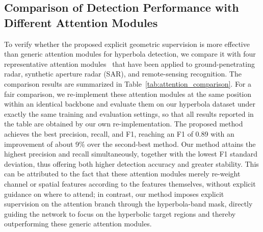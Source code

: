 \documentclass[lettersize,journal]{IEEEtran}
\begin{document}
\subsection{Comparison of Detection Performance with Different Attention Modules}
To verify whether the proposed explicit geometric supervision is more effective
than generic attention modules for hyperbola detection, we compare it with four
representative attention modules~\cite{SE,CBAM,Non-local,CA} that have been
applied to ground-penetrating radar, synthetic aperture radar (SAR), and
remote-sensing recognition. The comparison results are summarized in
Table~\ref{tab:attention_comparison}. For a fair comparison, we re-implement
these attention modules at the same position within an identical backbone and
evaluate them on our hyperbola dataset under exactly the same training and
evaluation settings, so that all results reported in the table are obtained by
our own re-implementation. The proposed method achieves the best precision,
recall, and F1, reaching an F1 of 0.89 with an improvement of about 9\% over the
second-best method. Our method attains the highest precision and recall
simultaneously, together with the lowest F1 standard deviation, thus offering
both higher detection accuracy and greater stability. This can be attributed to
the fact that these attention modules merely re-weight channel or spatial
features according to the features themselves, without explicit guidance on
where to attend; in contrast, our method imposes explicit supervision on the
attention branch through the hyperbola-band mask, directly guiding the network
to focus on the hyperbolic target regions and thereby outperforming these
generic attention modules.
\end{document}
